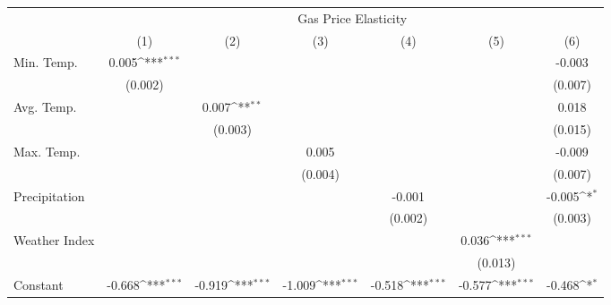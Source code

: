 {
\def\sym#1{\ifmmode^{#1}\else\(^{#1}\)\fi}
\begin{tabular}{l*{6}{c}}
\hline\hline
            &\multicolumn{6}{c}{Gas Price Elasticity}                                                                                           \\
            &\multicolumn{1}{c}{(1)}         &\multicolumn{1}{c}{(2)}         &\multicolumn{1}{c}{(3)}         &\multicolumn{1}{c}{(4)}         &\multicolumn{1}{c}{(5)}         &\multicolumn{1}{c}{(6)}         \\
\hline
Min. Temp.  &       0.005\sym{***}&                     &                     &                     &                     &      -0.003         \\
            &     (0.002)         &                     &                     &                     &                     &     (0.007)         \\
[1em]
Avg. Temp.  &                     &       0.007\sym{**} &                     &                     &                     &       0.018         \\
            &                     &     (0.003)         &                     &                     &                     &     (0.015)         \\
[1em]
Max. Temp.  &                     &                     &       0.005         &                     &                     &      -0.009         \\
            &                     &                     &     (0.004)         &                     &                     &     (0.007)         \\
[1em]
Precipitation&                     &                     &                     &      -0.001         &                     &      -0.005\sym{*}  \\
            &                     &                     &                     &     (0.002)         &                     &     (0.003)         \\
[1em]
Weather Index&                     &                     &                     &                     &       0.036\sym{***}&                     \\
            &                     &                     &                     &                     &     (0.013)         &                     \\
[1em]
Constant    &      -0.668\sym{***}&      -0.919\sym{***}&      -1.009\sym{***}&      -0.518\sym{***}&      -0.577\sym{***}&      -0.468\sym{*}  \\

\end{tabular}}
